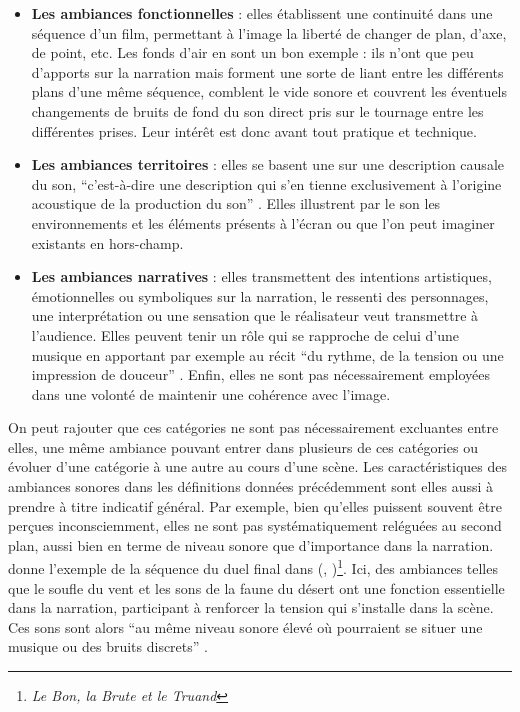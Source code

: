 ﻿\documentclass[12pt]{article}
\newcommand{\filmcite}[1]{\textit{\citetitle{#1}} (\citeauthor{#1}, \citeyear{#1})}
\begin{document}
\begin{itemize}
    \setlength\itemsep{0.8em}
    \item \textbf{Les ambiances fonctionnelles} : elles établissent une continuité dans une séquence d'un film, permettant à l'image la liberté de changer de plan, d'axe, de point, etc. Les fonds d'air en sont un bon exemple : ils n'ont que peu d'apports sur la narration mais forment une sorte de liant entre les différents plans d'une même séquence, comblent le vide sonore et couvrent les éventuels changements de bruits de fond du son direct pris sur le tournage entre les différentes prises. Leur intérêt est donc avant tout pratique et technique.
    \item \textbf{Les ambiances territoires} : elles se basent une sur une description causale du son, \enquote{c'est-à-dire une description qui s'en tienne exclusivement à l'origine acoustique de la production du son} \parencite{adjiman_qualifier_2015}. Elles illustrent par le son les environnements et les éléments présents à l'écran ou que l'on peut imaginer existants en hors-champ.
    \item \textbf{Les ambiances narratives} : elles transmettent des intentions artistiques, émotionnelles ou symboliques sur la narration, le ressenti des personnages, une interprétation ou une sensation que le réalisateur veut transmettre à l'audience. Elles peuvent tenir un rôle qui se rapproche de celui d'une musique en apportant par exemple au récit \enquote{du rythme, de la tension ou une impression de douceur} \parencite{adjiman_qualifier_2015}. Enfin, elles ne sont pas nécessairement employées dans une volonté de maintenir une cohérence avec l'image.
\end{itemize}
\vspace{1em}

On peut rajouter que ces catégories ne sont pas nécessairement excluantes entre elles, une même ambiance pouvant entrer dans plusieurs de ces catégories ou évoluer d'une catégorie à une autre au cours d'une scène. Les caractéristiques des ambiances sonores dans les définitions données précédemment sont elles aussi à prendre à titre indicatif général. Par exemple, bien qu'elles puissent souvent être perçues inconsciemment, elles ne sont pas systématiquement reléguées au second plan, aussi bien en terme de niveau sonore que d'importance dans la narration. \textcite{adjiman_usages_2018} donne l'exemple de la séquence du duel final dans \filmcite{il_buono_il_brutto_il_cattivo_1966}\footnote{\textit{Le Bon, la Brute et le Truand}}. Ici, des ambiances telles que le soufle du vent et les sons de la faune du désert ont une fonction essentielle dans la narration, participant à renforcer la tension qui s'installe dans la scène. Ces sons sont alors \enquote{au même niveau sonore élevé où pourraient se situer une musique ou des bruits discrets} \parencite{adjiman_usages_2018}.
\end{document}

